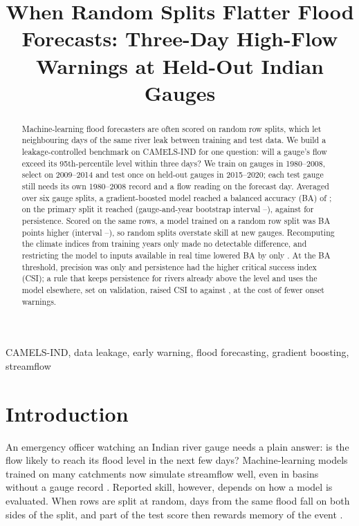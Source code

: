 \documentclass[conference]{IEEEtran}
\begin{document}
\title{When Random Splits Flatter Flood Forecasts: Three-Day High-Flow Warnings at Held-Out Indian Gauges}

\author{
}

\maketitle

\begin{abstract}
Machine-learning flood forecasters are often scored on random row splits, which let neighbouring days of the same river leak between training and test data. We build a leakage-controlled benchmark on CAMELS-IND for one question: will a gauge's flow exceed its 95th-percentile level within three days? We train on \NTrainGauges{} gauges in 1980--2008, select on 2009--2014 and test once on \NTestGauges{} held-out gauges in 2015--2020; each test gauge still needs its own 1980--2008 record and a flow reading on the forecast day. Averaged over six gauge splits, a gradient-boosted model reached a balanced accuracy (BA) of \SplitBAMean; on the primary split it reached \XgbBA{} (gauge-and-year bootstrap interval \MainBAGYLo--\MainBAGYHi), against \PersBA{} for persistence. Scored on the same rows, a model trained on a random row split was \SrGapBA{} BA points higher (interval \SrBALo--\SrBAHi), so random splits overstate skill at new gauges. Recomputing the climate indices from training years only made no detectable difference, and restricting the model to inputs available in real time lowered BA by only \RtDiff. At the BA threshold, precision was only \XgbPrec{} and persistence had the higher critical success index (CSI); a rule that keeps persistence for rivers already above the level and uses the model elsewhere, set on validation, raised CSI to \HyCSI{} against \PeCSI, at the cost of fewer onset warnings.
\end{abstract}

\begin{IEEEkeywords}
CAMELS-IND, data leakage, early warning, flood forecasting, gradient boosting, streamflow
\end{IEEEkeywords}

\section{Introduction}
An emergency officer watching an Indian river gauge needs a plain answer: is the flow likely to reach its flood level in the next few days? Machine-learning models trained on many catchments now simulate streamflow well, even in basins without a gauge record \cite{Kratzert2019a,Kratzert2019b,Nearing2024}. Reported skill, however, depends on how a model is evaluated. When rows are split at random, days from the same flood fall on both sides of the split, and part of the test score then rewards memory of the event \cite{Kapoor2023,Roberts2017}.
\end{document}
